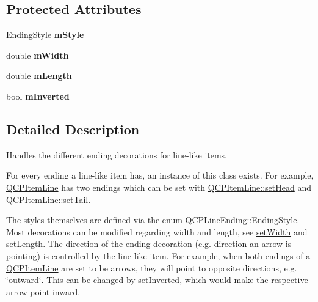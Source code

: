 \subsection*{Protected Attributes}
\begin{DoxyCompactItemize}
\item 
\hyperlink{class_q_c_p_line_ending_a5ef16e6876b4b74959c7261d8d4c2cd5}{Ending\+Style} {\bfseries m\+Style}\hypertarget{class_q_c_p_line_ending_a4696fc9117b60f1ca7690fcd2ba56611}{}\label{class_q_c_p_line_ending_a4696fc9117b60f1ca7690fcd2ba56611}

\item 
double {\bfseries m\+Width}\hypertarget{class_q_c_p_line_ending_aca89d21341133c20dc6825c33a5eac48}{}\label{class_q_c_p_line_ending_aca89d21341133c20dc6825c33a5eac48}

\item 
double {\bfseries m\+Length}\hypertarget{class_q_c_p_line_ending_ae8e1e2566b96c05736cd92662dba8af8}{}\label{class_q_c_p_line_ending_ae8e1e2566b96c05736cd92662dba8af8}

\item 
bool {\bfseries m\+Inverted}\hypertarget{class_q_c_p_line_ending_a91306fe771d54c955e0af21af14349d5}{}\label{class_q_c_p_line_ending_a91306fe771d54c955e0af21af14349d5}

\end{DoxyCompactItemize}


\subsection{Detailed Description}
Handles the different ending decorations for line-\/like items. 

 For every ending a line-\/like item has, an instance of this class exists. For example, \hyperlink{class_q_c_p_item_line}{Q\+C\+P\+Item\+Line} has two endings which can be set with \hyperlink{class_q_c_p_item_line_aebf3d687114d584e0459db6759e2c3c3}{Q\+C\+P\+Item\+Line\+::set\+Head} and \hyperlink{class_q_c_p_item_line_ac264222c3297a7efe33df9345c811a5f}{Q\+C\+P\+Item\+Line\+::set\+Tail}.

The styles themselves are defined via the enum \hyperlink{class_q_c_p_line_ending_a5ef16e6876b4b74959c7261d8d4c2cd5}{Q\+C\+P\+Line\+Ending\+::\+Ending\+Style}. Most decorations can be modified regarding width and length, see \hyperlink{class_q_c_p_line_ending_a26dc020ea985a72cc25881ce2115e34e}{set\+Width} and \hyperlink{class_q_c_p_line_ending_ae36fa01763751cd64b7f56c3507e935a}{set\+Length}. The direction of the ending decoration (e.\+g. direction an arrow is pointing) is controlled by the line-\/like item. For example, when both endings of a \hyperlink{class_q_c_p_item_line}{Q\+C\+P\+Item\+Line} are set to be arrows, they will point to opposite directions, e.\+g. \char`\"{}outward\char`\"{}. This can be changed by \hyperlink{class_q_c_p_line_ending_a580e4e2360b35ebb8d68f3494aa2335d}{set\+Inverted}, which would make the respective arrow point inward.

